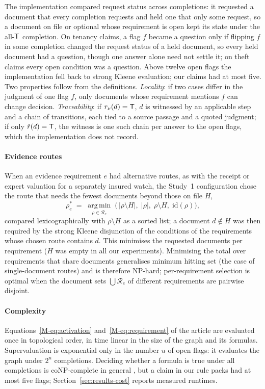 The implementation compared request status across completions: it requested a document that every completion requests and held one that only some request, so a document on file or optional whose requirement is open kept its state under the all-$\mathsf{T}$ completion. On tenancy claims, a flag $f$ became a question only if flipping $f$ in some completion changed the request status of a held document, so every held document had a question, though one answer alone need not settle it; on theft claims every open condition was a question. Above twelve open flags the implementation fell back to strong Kleene evaluation; our claims had at most five. Two properties follow from the definitions. \emph{Locality}: if two cases differ in the judgment of one flag $f$, only documents whose requirement mentions $f$ can change decision. \emph{Traceability}: if $r_\nu(d)=\mathsf{T}$, $d$ is witnessed by an applicable step and a chain of transitions, each tied to a source passage and a quoted judgment; if only $\hat r(d)=\mathsf{T}$, the witness is one such chain per answer to the open flags, which the implementation does not record.

\paragraph{Evidence routes}
When an evidence requirement $e$ had alternative routes, as with the receipt or expert valuation for a separately insured watch, the Study~1 configuration chose the route that needs the fewest documents beyond those on file $H$,
\begin{equation}
\rho^\ast_e \;=\; \operatorname*{arg\,min}_{\rho\in\mathcal{R}_e}\;\bigl(\,|\rho\setminus H|,\;|\rho|,\;\rho\setminus H,\;\mathrm{id}(\rho)\bigr),
\label{eq:route}
\end{equation}
compared lexicographically with $\rho\setminus H$ as a sorted list; a document $d\notin H$ was then required by the strong Kleene disjunction of the conditions of the requirements whose chosen route contains $d$. This minimises the requested documents per requirement ($H$ was empty in all our experiments). Minimising the total over requirements that share documents generalises minimum hitting set (the case of single-document routes) and is therefore NP-hard; per-requirement selection is optimal when the document sets $\bigcup\mathcal{R}_e$ of different requirements are pairwise disjoint.

\paragraph{Complexity}
Equations~\eqref{M-eq:activation} and~\eqref{M-eq:requirement} of the article are evaluated once in topological order, in time linear in the size of the graph and its formulas. Supervaluation is exponential only in the number $u$ of open flags: it evaluates the graph under $2^u$ completions. Deciding whether a formula is true under all completions is coNP-complete in general \cite{cook1971complexity}, but a claim in our rule packs had at most five flags; Section~\ref{sec:results-cost} reports measured runtimes.


